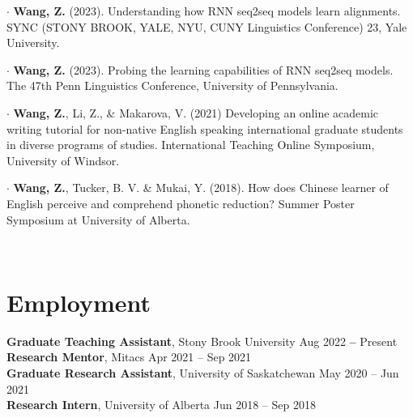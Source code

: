 \documentclass[letterpaper,11pt]{article}
\newcommand{\resumeSubHeadingListStart}{\begin{itemize}[leftmargin=0.15in, label={}]}
\newcommand{\resumeSubHeadingListEnd}{\end{itemize}}
\begin{document}
  \resumeSubHeadingListStart
    \small{\item{
%        
%        
        $\cdot$ \textbf{Wang, Z.} (2023). Understanding how RNN seq2seq models learn alignments. SYNC (STONY BROOK, YALE, NYU, CUNY Linguistics Conference) 23, Yale University. \\ \vspace{2pt}
        
        $\cdot$ \textbf{Wang, Z.} (2023). Probing the learning capabilities of RNN seq2seq models. The 47th Penn Linguistics Conference, University of Pennsylvania. \\ \vspace{2pt}
        
        $\cdot$ \textbf{Wang, Z.}, Li, Z., \& Makarova, V. (2021) Developing an online academic writing tutorial for non-native English speaking international graduate students in diverse programs of studies. International Teaching Online Symposium, University of Windsor. \\ \vspace{2pt}
        
        $\cdot$ \textbf{Wang, Z.}, Tucker, B. V. \& Mukai, Y. (2018). How does Chinese learner of English perceive and comprehend phonetic reduction? Summer Poster Symposium at University of Alberta.
    }} \\ \vspace{-5pt}
  \resumeSubHeadingListEnd
  
 

\section{Employment}
  \resumeSubHeadingListStart
    \small{\item{
        \textbf{Graduate Teaching Assistant}, Stony Brook University \hfill Aug 2022 \textbf{--} Present \\ \vspace{1pt}
        \textbf{Research Mentor}, Mitacs \hfill Apr 2021 – Sep 2021 \\ \vspace{1pt}
        \textbf{Graduate Research Assistant}, University of Saskatchewan \hfill May 2020 – Jun 2021 \\ \vspace{1pt}
        \textbf{Research Intern}, University of Alberta \hfill Jun 2018 – Sep 2018}} \\ \vspace{-5pt}
  \resumeSubHeadingListEnd
 
\end{document}
